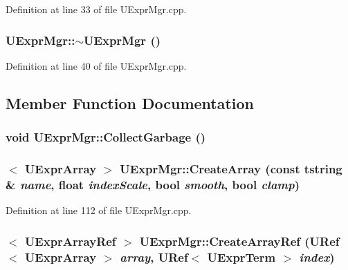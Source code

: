 Definition at line 33 of file UExprMgr.cpp.\hypertarget{class_u_expr_mgr_30657d4463c40f1d5f09377274b9f9dd}{
\subsubsection[{$\sim$UExprMgr}]{\setlength{\rightskip}{0pt plus 5cm}UExprMgr::$\sim$UExprMgr ()}}
\label{class_u_expr_mgr_30657d4463c40f1d5f09377274b9f9dd}




Definition at line 40 of file UExprMgr.cpp.

\subsection{Member Function Documentation}
\hypertarget{class_u_expr_mgr_8babe6017bf15496526870d8d3254bbf}{
\subsubsection[{CollectGarbage}]{\setlength{\rightskip}{0pt plus 5cm}void UExprMgr::CollectGarbage ()}}
\label{class_u_expr_mgr_8babe6017bf15496526870d8d3254bbf}


\hypertarget{class_u_expr_mgr_18db87e4cabfcff47d49d313d080ed44}{
\subsubsection[{CreateArray}]{$<$ {\bf UExprArray} $>$ UExprMgr::CreateArray (const {\bf tstring} \& {\em name}, \/  float {\em indexScale}, \/  bool {\em smooth}, \/  bool {\em clamp})}}
\label{class_u_expr_mgr_18db87e4cabfcff47d49d313d080ed44}




Definition at line 112 of file UExprMgr.cpp.\hypertarget{class_u_expr_mgr_fa2c22981d73f120ee52777ecc34a8ed}{
\subsubsection[{CreateArrayRef}]{$<$ {\bf UExprArrayRef} $>$ UExprMgr::CreateArrayRef ({\bf URef}$<$ {\bf UExprArray} $>$ {\em array}, \/  {\bf URef}$<$ {\bf UExprTerm} $>$ {\em index})}}
\label{class_u_expr_mgr_fa2c22981d73f120ee52777ecc34a8ed}




